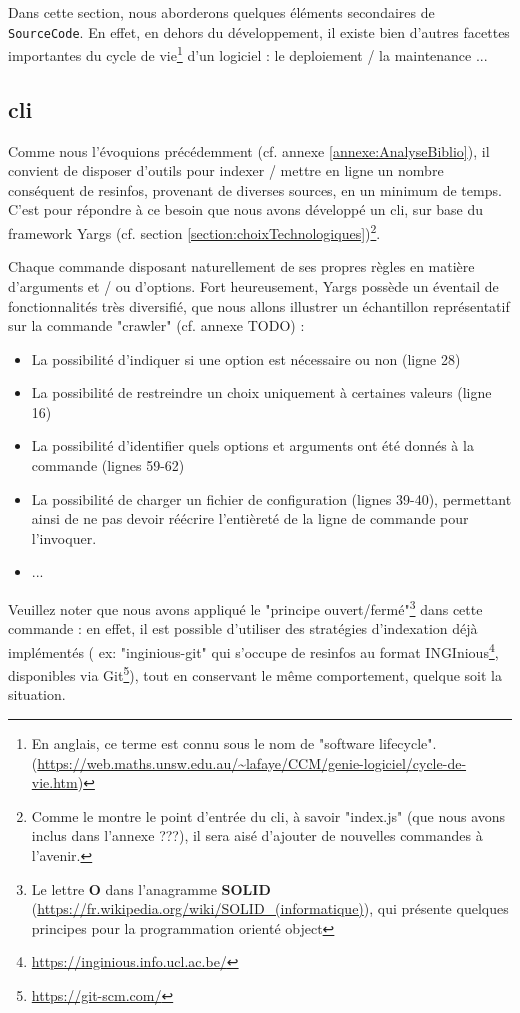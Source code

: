 Dans cette section, nous aborderons quelques éléments secondaires de \texttt{SourceCode}.
En effet, en dehors du développement, il existe bien d'autres facettes importantes du cycle de vie\footnote{
    En anglais, ce terme est connu sous le nom de "software lifecycle". (\url{https://web.maths.unsw.edu.au/~lafaye/CCM/genie-logiciel/cycle-de-vie.htm})
} d'un logiciel : le \gls{deploiement} / la \gls{maintenance}  ...

\subsection{\texorpdfstring{\Gls{cli}}{CLI}}

Comme nous l'évoquions précédemment (cf. annexe \ref{annexe:AnalyseBiblio}), il convient de disposer d'outils pour indexer / mettre en ligne un nombre conséquent de 
\glspl{resinfo}, provenant de diverses sources, en un minimum de temps. C'est pour répondre à ce besoin que nous avons développé un \Gls{cli}, sur base du framework Yargs
(cf. section \ref{section:choixTechnologiques})\footnote{
    Comme le montre le point d'entrée du \Gls{cli}, à savoir "index.js" (que nous avons inclus dans l'annexe ???), il sera aisé d'ajouter de nouvelles commandes à l'avenir.
}.



Chaque commande disposant naturellement de ses propres règles en matière d'arguments et / ou d'options.
Fort heureusement, Yargs possède un éventail de fonctionnalités très diversifié, que nous allons illustrer un échantillon représentatif sur la commande "crawler" (cf. annexe TODO) :
\begin{itemize}[nosep,noitemsep,topsep=0pt,partopsep=0pt,after=\vspace*{2pt}]
    \item La possibilité d'indiquer si une option est nécessaire ou non (ligne 28)
    \item La possibilité de restreindre un choix uniquement à certaines valeurs (ligne 16)
    \item La possibilité d'identifier quels options et arguments ont été donnés à la commande (lignes 59-62)
    \item La possibilité de charger un fichier de configuration (lignes 39-40), permettant ainsi de ne pas devoir réécrire l'entièreté de la ligne de commande pour l'invoquer. 
    \item ...
\end{itemize}
Veuillez noter que nous avons appliqué le "principe ouvert/fermé"\footnote{
    Le lettre \textbf{O} dans l'anagramme \textbf{SOLID} (\url{https://fr.wikipedia.org/wiki/SOLID\_(informatique)}), qui présente quelques principes pour la programmation orienté object
} dans cette commande : en effet, il est possible d'utiliser des stratégies d'indexation déjà implémentés (
ex: "inginious-git" qui s'occupe de \glspl{resinfo} au format INGInious\footnote{
    \url{https://inginious.info.ucl.ac.be/}
}, disponibles via Git\footnote{
    \url{https://git-scm.com/}
}), tout en conservant le même comportement, quelque soit la situation. 

